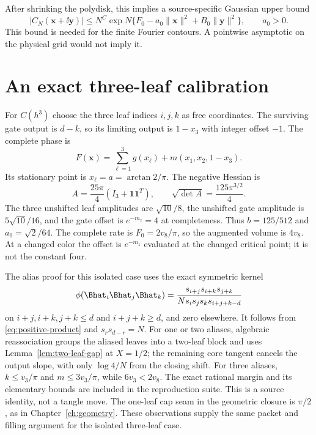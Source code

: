 After shrinking the polydisk, this implies a source-specific Gaussian upper bound
\begin{equation}\label{eq:complex-gaussian-bound}
 |C_N(\mathbf x+\ii\mathbf y)|
 \le N^C\exp N\{F_0-a_0\|\mathbf x\|^2+B_0\|\mathbf y\|^2\},
 \qquad a_0>0.
\end{equation}
This bound is needed for the finite Fourier contours. A pointwise asymptotic on the physical grid would not imply it.

\section{An exact three-leaf calibration}\label{sec:isolated}
For $C(h^3)$ choose the three leaf indices $i,j,k$ as free coordinates. The surviving gate output is $d-k$, so its limiting output is $1-x_3$ with integer offset $-1$. The complete phase is
\[
 F(\mathbf x)=\sum_{\ell=1}^3g(x_\ell)+m(x_1,x_2,1-x_3).
\]
Its stationary point is $x_\ell=a=\arctan2/\pi$. The negative Hessian is
\[
 A=\frac{25\pi}{4}(I_3+\mathbf1\mathbf1^T),\qquad
 \sqrt{\det A}=\frac{125\pi^{3/2}}4.
\]
The three unshifted leaf amplitudes are $\sqrt{10}/8$, the unshifted gate amplitude is $5\sqrt{10}/16$, and the gate offset is $e^{-m_z}=4$ at completeness. Thus $b=125/512$ and $a_0=\sqrt2/64$. The complete rate is $F_0=2v_8/\pi$, so the augmented volume is $4v_8$. At a changed color the offset is $e^{-m_z}$ evaluated at the changed critical point; it is not the constant four.

The alias proof for this isolated case uses the exact symmetric kernel
\[
 \phi(\Bhat_i\Bhat_j\Bhat_k)
 =\frac{s_{i+j}s_{i+k}s_{j+k}}
 {N s_i s_j s_k s_{i+j+k-d}}
\]
on $i+j,i+k,j+k\le d$ and $i+j+k\ge d$, and zero elsewhere. It follows from \eqref{eq:positive-product} and $s_rs_{d-r}=N$. For one or two aliases, algebraic reassociation groups the aliased leaves into a two-leaf block and uses Lemma~\ref{lem:two-leaf-gap} at $X=1/2$; the remaining core tangent cancels the output slope, with only $\log4/N$ from the closing shift. For three aliases, $k\le v_3/\pi$ and $m\le3v_3/\pi$, while $6v_3<2v_8$. The exact rational margin and its elementary bounds are included in the reproduction suite. This is a source identity, not a tangle move. The one-leaf cap seam in the geometric closure is $\pi/2$, as in Chapter~\ref{ch:geometry}. These observations supply the same packet and filling argument for the isolated three-leaf case.
